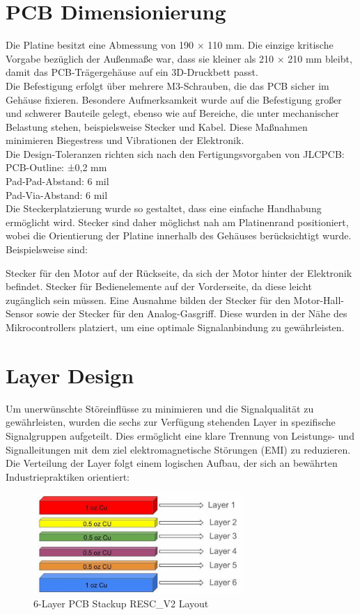 \documentclass[paper=a4,11pt]{scrreprt}
\begin{document}
\section{PCB Dimensionierung}
Die Platine besitzt eine Abmessung von 190 × 110 mm. Die einzige kritische Vorgabe bezüglich der Außenmaße war, dass sie kleiner als 210 × 210 mm bleibt, damit das PCB-Trägergehäuse auf ein 3D-Druckbett passt.\\
Die Befestigung erfolgt über mehrere M3-Schrauben, die das PCB sicher im Gehäuse fixieren. Besondere Aufmerksamkeit wurde auf die Befestigung großer und schwerer Bauteile gelegt, ebenso wie auf Bereiche, die unter mechanischer Belastung stehen, beispielsweise Stecker und Kabel. Diese Maßnahmen minimieren Biegestress und Vibrationen der Elektronik.\\
Die Design-Toleranzen richten sich nach den Fertigungsvorgaben von JLCPCB:\\
PCB-Outline: ±0,2 mm\\
Pad-Pad-Abstand: 6 mil\\
Pad-Via-Abstand: 6 mil\\
Die Steckerplatzierung wurde so gestaltet, dass eine einfache Handhabung ermöglicht wird. Stecker sind daher möglichst nah am Platinenrand positioniert, wobei die Orientierung der Platine innerhalb des Gehäuses berücksichtigt wurde. Beispielsweise sind:

Stecker für den Motor auf der Rückseite, da sich der Motor hinter der Elektronik befindet.
Stecker für Bedienelemente auf der Vorderseite, da diese leicht zugänglich sein müssen.
Eine Ausnahme bilden der Stecker für den Motor-Hall-Sensor sowie der Stecker für den Analog-Gasgriff. Diese wurden in der Nähe des Mikrocontrollers platziert, um eine optimale Signalanbindung zu gewährleisten.

\section{Layer Design}
Um unerwünschte Störeinflüsse zu minimieren und die Signalqualität zu gewährleisten, wurden die sechs zur Verfügung stehenden Layer in spezifische Signalgruppen aufgeteilt. Dies ermöglicht eine klare Trennung von Leistungs- und Signalleitungen mit dem ziel elektromagnetische Störungen (EMI) zu reduzieren. Die Verteilung der Layer folgt einem logischen Aufbau, der sich an bewährten Industriepraktiken orientiert:\\

\begin{figure}[ht]
\begin{center}
\includegraphics[width=8cm]{Bilder/LayerStack.PNG}
\caption{6-Layer PCB Stackup RESC\_V2 Layout}
\label{lstack}
\end{center}
\end{figure}
\end{document}

